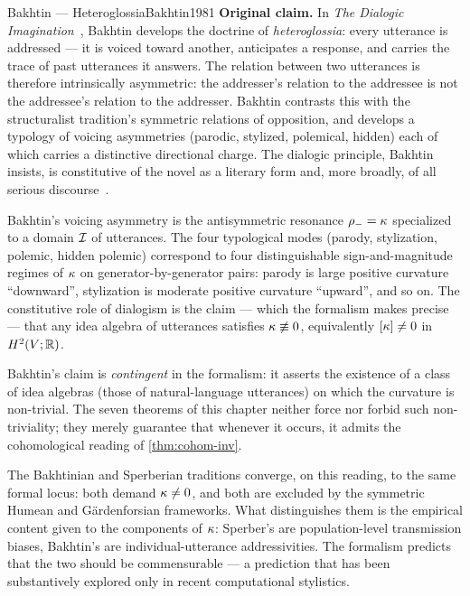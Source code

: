 \begin{zooentry}{Bakhtin --- Heteroglossia}{Bakhtin1981}
\textbf{Original claim.} In \emph{The Dialogic Imagination}~\cite{Bakhtin1981},
Bakhtin develops the doctrine of \emph{heteroglossia}: every utterance is
addressed --- it is voiced toward another, anticipates a response, and
carries the trace of past utterances it answers. The relation between two
utterances is therefore intrinsically asymmetric: the addresser's
relation to the addressee is not the addressee's relation to the
addresser. Bakhtin contrasts this with the structuralist tradition's
symmetric relations of opposition, and develops a typology of voicing
asymmetries (parodic, stylized, polemical, hidden) each of which carries a
distinctive directional charge. The dialogic principle, Bakhtin insists,
is constitutive of the novel as a literary form and, more broadly, of all
serious discourse~\cite[pp.~259--422]{Bakhtin1981}.

\formalclaim
Bakhtin's voicing asymmetry is the antisymmetric resonance $\rho_-=\kappa$
specialized to a domain $\mathcal{I}$ of utterances. The four typological
modes (parody, stylization, polemic, hidden polemic) correspond to four
distinguishable sign-and-magnitude regimes of $\kappa$ on
generator-by-generator pairs: parody is large positive curvature
``downward'', stylization is moderate positive curvature ``upward'', and
so on. The constitutive role of dialogism is the claim --- which the
formalism makes precise --- that any idea algebra of utterances satisfies
$\kappa\not\equiv 0$, equivalently $[\kappa]\ne 0$ in $H^2(V;\mathbb{R})$.

\formalstatus
Bakhtin's claim is \emph{contingent} in the formalism: it asserts the
existence of a class of idea algebras (those of natural-language
utterances) on which the curvature is non-trivial. The seven theorems of
this chapter neither force nor forbid such non-triviality; they merely
guarantee that whenever it occurs, it admits the cohomological reading
of \cref{thm:cohom-inv}.

\litcomment
The Bakhtinian and Sperberian traditions converge, on this reading, to
the same formal locus: both demand $\kappa\ne 0$, and both are excluded
by the symmetric Humean and G\"ardenforsian frameworks. What distinguishes
them is the empirical content given to the components of $\kappa$:
Sperber's are population-level transmission biases, Bakhtin's are
individual-utterance addressivities. The formalism predicts that the two
should be commensurable --- a prediction that has been substantively
explored only in recent computational stylistics.
\end{zooentry}

